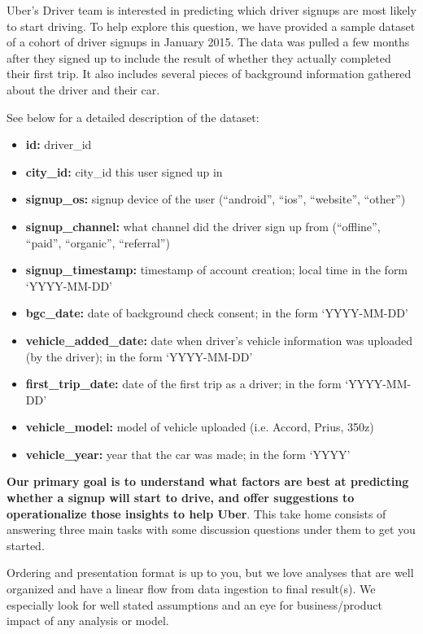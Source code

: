 \documentclass[11pt]{article}
\providecommand{\tightlist}{%
      \setlength{\itemsep}{0pt}\setlength{\parskip}{0pt}}
\begin{document}
Uber's Driver team is interested in predicting which driver signups are
most likely to start driving. To help explore this question, we have
provided a sample dataset of a cohort of driver signups in January 2015.
The data was pulled a few months after they signed up to include the
result of whether they actually completed their first trip. It also
includes several pieces of background information gathered about the
driver and their car.

See below for a detailed description of the dataset:

\begin{itemize}
\tightlist
\item
  \textbf{id:} driver\_id
\item
  \textbf{city\_id:} city\_id this user signed up in
\item
  \textbf{signup\_os:} signup device of the user (``android'', ``ios'',
  ``website'', ``other'')
\item
  \textbf{signup\_channel:} what channel did the driver sign up from
  (``offline'', ``paid'', ``organic'', ``referral'')
\item
  \textbf{signup\_timestamp:} timestamp of account creation; local time
  in the form `YYYY-MM-DD'
\item
  \textbf{bgc\_date:} date of background check consent; in the form
  `YYYY-MM-DD'
\item
  \textbf{vehicle\_added\_date:} date when driver's vehicle information
  was uploaded (by the driver); in the form `YYYY-MM-DD'
\item
  \textbf{first\_trip\_date:} date of the first trip as a driver; in the
  form `YYYY-MM-DD'
\item
  \textbf{vehicle\_model:} model of vehicle uploaded (i.e. Accord,
  Prius, 350z)
\item
  \textbf{vehicle\_year:} year that the car was made; in the form `YYYY'
\end{itemize}

\textbf{Our primary goal is to understand what factors are best at
predicting whether a signup will start to drive, and offer suggestions
to operationalize those insights to help Uber}. This take home consists
of answering three main tasks with some discussion questions under them
to get you started.

Ordering and presentation format is up to you, but we love analyses that
are well organized and have a linear flow from data ingestion to final
result(s). We especially look for well stated assumptions and an eye for
business/product impact of any analysis or model.
\end{document}
